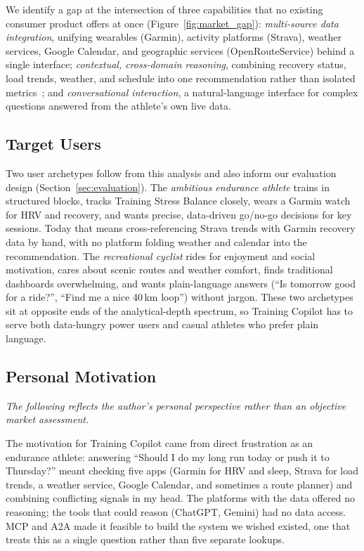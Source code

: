 We identify a gap at the intersection of three capabilities that no existing consumer product offers at once (Figure~\ref{fig:market_gap}): \textit{multi-source data integration}, unifying wearables (Garmin), activity platforms (Strava), weather services, Google Calendar, and geographic services (OpenRouteService) behind a single interface; \textit{contextual, cross-domain reasoning}, combining recovery status, load trends, weather, and schedule into one recommendation rather than isolated metrics~\citep{bourdon_monitoring_2017}; and \textit{conversational interaction}, a natural-language interface for complex questions answered from the athlete's own live data.



\subsection{Target Users}\label{sec:market:users}

Two user archetypes follow from this analysis and also inform our evaluation design (Section~\ref{sec:evaluation}). The \textit{ambitious endurance athlete} trains in structured blocks, tracks Training Stress Balance closely, wears a Garmin watch for HRV and recovery, and wants precise, data-driven go/no-go decisions for key sessions. Today that means cross-referencing Strava trends with Garmin recovery data by hand, with no platform folding weather and calendar into the recommendation. The \textit{recreational cyclist} rides for enjoyment and social motivation, cares about scenic routes and weather comfort, finds traditional dashboards overwhelming, and wants plain-language answers (``Is tomorrow good for a ride?'', ``Find me a nice 40\,km loop'') without jargon. These two archetypes sit at opposite ends of the analytical-depth spectrum, so Training Copilot has to serve both data-hungry power users and casual athletes who prefer plain language.

\subsection{Personal Motivation}\label{sec:market:motivation}

\textit{The following reflects the author's personal perspective rather than an objective market assessment.}

The motivation for Training Copilot came from direct frustration as an endurance athlete: answering ``Should I do my long run today or push it to Thursday?'' meant checking five apps (Garmin for HRV and sleep, Strava for load trends, a weather service, Google Calendar, and sometimes a route planner) and combining conflicting signals in my head. The platforms with the data offered no reasoning; the tools that could reason (ChatGPT, Gemini) had no data access. MCP and A2A made it feasible to build the system we wished existed, one that treats this as a single question rather than five separate lookups.
